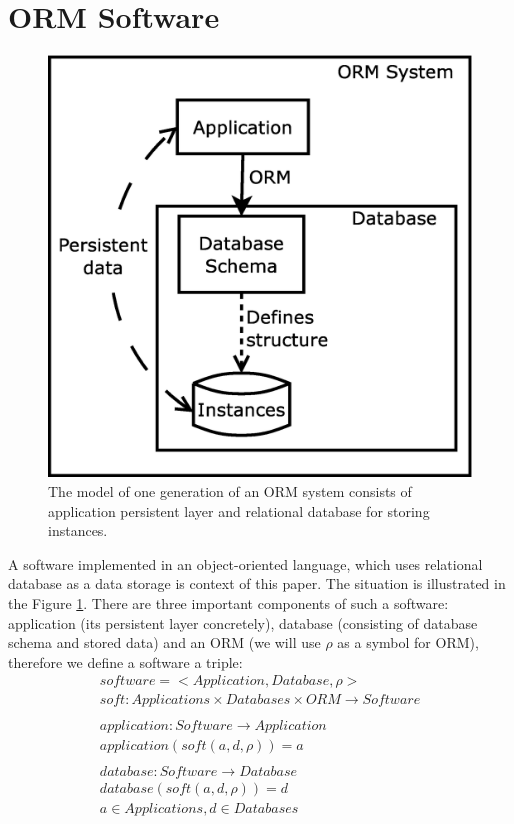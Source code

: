 \documentclass[11pt]{article}
\begin{document}
\section{ORM Software}
\label{sec:evoIntro}
\begin{figure}
\centering
	\includegraphics[scale=0.3]{./images/system}
	\caption{The model of one generation of an ORM system consists of application persistent layer and relational database for storing instances.}
\label{fig:appStructure}
\end{figure}
A software implemented in an object-oriented language, which uses relational database as a data storage is context of this paper. The situation is illustrated in the Figure \ref{fig:appStructure}. There are three important components of such a software: application (its persistent layer concretely), database (consisting of database schema and stored data) and an ORM (we will use $\rho$ as a symbol for ORM), therefore we define a software a triple:
\begin{gather*}
	software = < Application, Database, \rho > \\
	soft : Applications \times Databases \times ORM \rightarrow Software \\ \\
	application : Software \rightarrow Application \\
	application(soft(a, d, \rho)) = a \\ \\
	database : Software \rightarrow Database \\
	database(soft(a, d, \rho)) = d \\
	a \in Applications, d \in Databases
\end{gather*}
\end{document}
